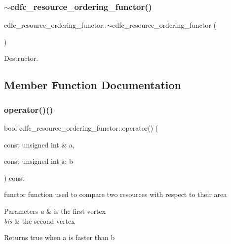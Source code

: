 \subsubsection{\texorpdfstring{$\sim$cdfc\+\_\+resource\+\_\+ordering\+\_\+functor()}{~cdfc\_resource\_ordering\_functor()}}
{\footnotesize\ttfamily cdfc\+\_\+resource\+\_\+ordering\+\_\+functor\+::$\sim$cdfc\+\_\+resource\+\_\+ordering\+\_\+functor (\begin{DoxyParamCaption}{ }\end{DoxyParamCaption})\hspace{0.3cm}{\ttfamily [default]}}



Destructor. 



\subsection{Member Function Documentation}
\mbox{\label{structcdfc__resource__ordering__functor_ad09f8b3eebdf4a355cba1eeae2df6993}} 
\subsubsection{\texorpdfstring{operator()()}{operator()()}}
{\footnotesize\ttfamily bool cdfc\+\_\+resource\+\_\+ordering\+\_\+functor\+::operator() (\begin{DoxyParamCaption}\item[{const unsigned int \&}]{a,  }\item[{const unsigned int \&}]{b }\end{DoxyParamCaption}) const\hspace{0.3cm}{\ttfamily [inline]}}



functor function used to compare two resources with respect to their area 


\begin{DoxyParams}{Parameters}
{\em a} & is the first vertex \\
\hline
{\em bis} & the second vertex \\
\hline
\end{DoxyParams}
\begin{DoxyReturn}{Returns}
true when a is faster than b 
\end{DoxyReturn}


